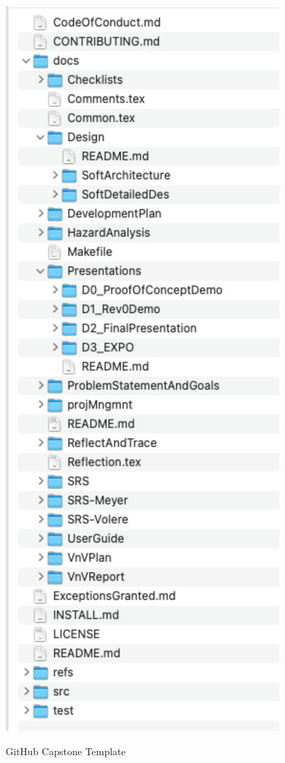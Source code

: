 \documentclass[10pt, conference]{IEEEtran}
\begin{document}
\begin{figure}[h!]
  \begin{center}
    {
      \includegraphics[width=0.7\columnwidth]{./figures/GitHubTemplate}
    }
    \caption{\label{Fig_GitHubTemplate} GitHub Capstone Template}
  \end{center}
\end{figure}
\end{document}
